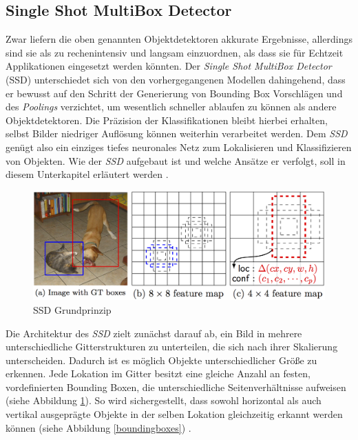 \subsection*{Single Shot MultiBox Detector}

Zwar liefern die oben genannten Objektdetektoren akkurate Ergebnisse, allerdings sind sie als zu rechenintensiv und langsam einzuordnen, als dass sie für Echtzeit Applikationen eingesetzt werden könnten. Der \textit{Single Shot MultiBox Detector} (SSD) unterschiedet sich von den vorhergegangenen Modellen dahingehend, dass er bewusst auf den Schritt der Generierung von Bounding Box Vorschlägen und des \textit{Poolings} verzichtet, um wesentlich schneller ablaufen zu können als andere Objektdetektoren. Die Präzision der Klassifikationen bleibt hierbei erhalten, selbst Bilder niedriger Auflösung können weiterhin verarbeitet werden. Dem \textit{SSD} genügt also ein einziges tiefes neuronales Netz zum Lokalisieren und Klassifizieren von Objekten. Wie der \textit{SSD} aufgebaut ist und welche Ansätze er verfolgt, soll in diesem Unterkapitel erläutert werden \cite{ssd.20161229}. 

\begin{figure}[ht]
	\begin{center}
		\includegraphics[width=15cm]{Bilder/ssd_framework.png} 
		\caption[SSD Grundprinzip]{SSD Grundprinzip \cite{ssd.20161229}}
		\label{framework}
	\end{center}
\end{figure}

Die Architektur des \textit{SSD} zielt zunächst darauf ab, ein Bild in mehrere unterschiedliche Gitterstrukturen zu unterteilen, die sich nach ihrer Skalierung unterscheiden. Dadurch ist es möglich Objekte unterschiedlicher Größe zu erkennen. Jede Lokation im Gitter besitzt eine gleiche Anzahl an festen, vordefinierten Bounding Boxen, die unterschiedliche Seitenverhältnisse aufweisen (siehe Abbildung \ref{framework}). So wird sichergestellt, dass sowohl horizontal als auch vertikal ausgeprägte Objekte in der selben Lokation gleichzeitig erkannt werden können (siehe Abbildung \ref{boundingboxes}) \cite{ssd.20161229}.

